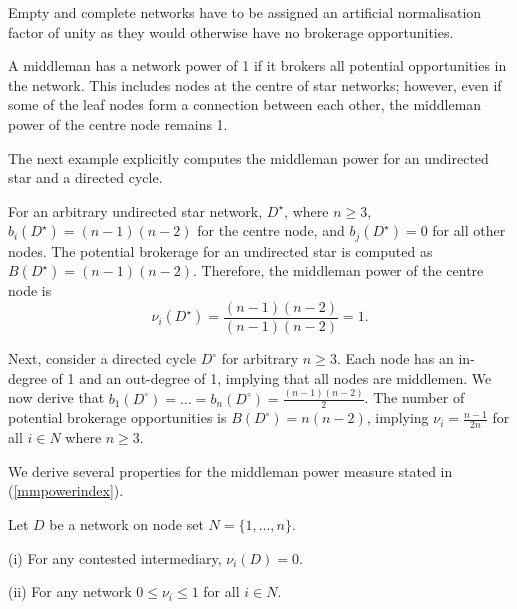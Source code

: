 Empty and complete networks have to be assigned an artificial normalisation factor of unity as they would otherwise have no brokerage opportunities. 

A middleman has a network power of 1 if it brokers all potential opportunities in the network. This includes nodes at the centre of star networks; however, even if some of the leaf nodes form a connection between each other, the middleman power of the centre node remains 1.

The next example explicitly computes the middleman power for an undirected star and a directed cycle.

\begin{example} \label{starcycle}
For an arbitrary undirected star network, $D^{\star}$, where $n \geqslant 3$, $b_{i}(D^{\star}) = (n-1)(n-2)$ for the centre node, and $b_{j}(D^{\star})=0$ for all other nodes. The potential brokerage for an undirected star is computed as $B(D^{\star}) = (n-1)(n-2)$. Therefore, the middleman power of the centre node is
\begin{equation}
\nu_{i}(D^{\star}) = \frac{(n-1)(n-2)}{(n-1)(n-2)} = 1 .
\end{equation}

\noindent Next, consider a directed cycle $D^{\circ}$ for arbitrary $n\geqslant 3$. Each node has an in-degree of 1 and an out-degree of 1, implying that all nodes are middlemen. We now derive that $b_{1}(D^{\circ}) = \ldots = b_{n}(D^{\circ}) = \frac{(n-1)(n-2)}{2}$. The number of potential brokerage opportunities is $B (D^{\circ}) = n(n-2)$, implying $\nu_i = \frac{n-1}{2n}$ for all $i \in N$ where $n \geqslant 3$.
\end{example}

We derive several properties for the middleman power measure stated in (\ref{mmpowerindex}).

\begin{theorem} \label{middlemanpowert}
Let $D$ be a network on node set $N=\{1, \ldots ,n\}$.
\begin{abet}
\item[(i)] For any contested intermediary, $\nu_{i}(D) = 0$.
\item[(ii)] For any network $0 \leqslant \nu_{i} \leqslant 1$ for all $i \in N$.
\end{abet}
\end{theorem}

